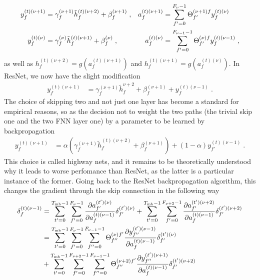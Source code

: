 \begin{subappendices}
\begin{align}
y_{f}^{(t)(\nu+1)}&=\gamma_f^{(\nu+1)}\tilde{h}_f^{(t)(\nu+2)}+\beta_f^{(\nu+1)}\;,&
%
a_{f}^{(t)(\nu+1)}&=\sum^{F_{\nu}-1}_{f'=0}\Theta^{(\nu+1)f}_{f'}y_{f}^{(t)(\nu)}\notag\\
%
y_{f}^{(t)(\nu)}&=\gamma_f^{(\nu)}\tilde{h}_f^{(t)(\nu+1)}+\beta_f^{(\nu)}\;,&
%
a_{f}^{(t)(\nu)}&=\sum^{F_{\nu-1}-1}_{f'=0}\Theta^{(\nu)f}_{f'}y_{f}^{(t)(\nu-1)}\;,
\end{align}
as well as $h^{(t)(\nu+2)}_f=g\left(a_{f}^{(t)(\nu+1)}\right)$ and $h^{(t)(\nu+1)}_f=g\left(a_{f}^{(t)(\nu)}\right)$. In ResNet, we now have the slight modification
\begin{align}
y_{f}^{(t)(\nu+1)}&=\gamma_f^{(\nu+1)}\tilde{h}_f^{\nu+2}+\beta_f^{(\nu+1)}+y^{(t)(\nu-1)}_{f}\;.
\end{align}
The choice of skipping two and not just one layer has become a standard for empirical reasons, so as the decision not to weight the two paths (the trivial skip one and the two FNN layer one) by a parameter to be learned by backpropagation 
\begin{align}
y_{f}^{(t)(\nu+1)}&=\alpha\left(\gamma_f^{(\nu+1)}\tilde{h}_f^{(t)(\nu+2)}+\beta_f^{(\nu+1)}\right)
%
+\left( 1-\alpha\right)y^{(t)(\nu-1)}_{f'}\;.
\end{align}
This choice is called highway nets\cite{citeulike:14070430}, and it remains to be theoretically understood why it leads to worse perfomance than ResNet, as the latter is a particular instance of the former. Going back to the ResNet backpropagation algorithm, this changes the gradient through the skip connection in the following way
\begin{align}
\delta^{(t)(\nu-1)}_f&=
%
\sum_{t'=0}^{T_{{\rm mb}}-1}\sum_{f'=0}^{F_{\nu}-1}
%
 \frac{\partial  a_{f'}^{(t')(\nu)}}{\partial  a_{f}^{(t)(\nu-1)}} \delta^{(t')(\nu)}_{f'}
+\sum_{t'=0}^{T_{{\rm mb}}-1}\sum_{f'=0}^{F_{\nu+2}-1}
%
 \frac{\partial  a_{f'}^{(t')(\nu+2)}}{\partial  a_{f}^{(t)(\nu-1)}} \delta^{(t')(\nu+2)}_{f'}\notag\\
%
&=\sum_{t'=0}^{T_{{\rm mb}}-1}\sum_{f'=0}^{F_{\nu}-1}\sum^{F_{\nu-1}-1}_{f''=0}\Theta^{(\nu)f'}_{f''}
%
\frac{\partial y^{(t')(\nu-1)}_{f''} }{\partial  a_{f}^{(t)(\nu-1)}} \delta^{(t')(\nu)}_{f'}\notag\\
%
&+\sum_{t'=0}^{T_{{\rm mb}}-1}\sum_{f'=0}^{F_{\nu+2}-1}\sum^{F_{\nu-1}-1}_{f''=0}\Theta^{(\nu+2)f'}_{f''}
%
\frac{\partial y^{(t')(\nu+1)}_{f''} }{\partial  a_{f}^{(t)(\nu-1)}} \delta^{(t')(\nu+2)}_{f'}\notag\\

\end{align}
\end{subappendices}

